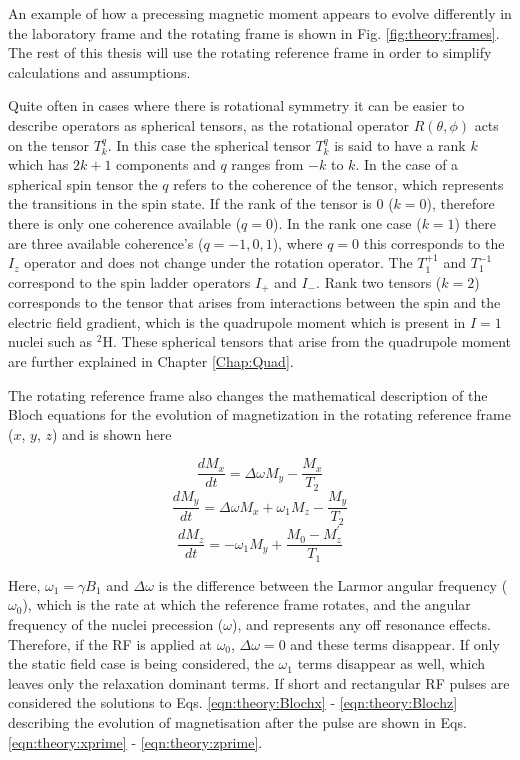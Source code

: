 An example of how a precessing magnetic moment appears to evolve differently in the laboratory frame and the rotating frame is shown in Fig. \ref{fig:theory:frames}. The rest of this thesis will use the rotating reference frame in order to simplify calculations and assumptions. 

Quite often in cases where there is rotational symmetry it can be easier to describe operators as spherical tensors, as the rotational operator $R(\theta,\phi)$ acts on the tensor $T^q_k$. In this case the spherical tensor $T_k^{q}$ is said to have a rank $k$ which has $2k+1$ components and $q$ ranges from $-k$ to $k$. In the case of a spherical spin tensor the $q$ refers to the coherence of the tensor, which represents the transitions in the spin state. If the rank of the tensor is 0 ($k = 0$), therefore there is only one coherence available ($q = 0$). In the rank one case ($k=1$) there are three available coherence's ($q=-1,0,1$), where $q=0$ this corresponds to the $I_z$ operator and does not change under the rotation operator. The $T_1^{+1}$ and $T_1^{-1}$ correspond to the spin ladder operators $I_+$ and $I_-$. Rank two tensors ($k=2$) corresponds to the tensor that arises from interactions between the spin and the electric field gradient, which is the quadrupole moment which is present in $I=1$ nuclei such as $^2$H. These spherical tensors that arise from the quadrupole moment are further explained in Chapter \ref{Chap:Quad}.

The rotating reference frame also changes the mathematical description of the Bloch equations for the evolution of magnetization in the rotating reference frame ($x$, $y$, $z$) and is shown here 

\begin{equation}
    \frac{dM_x}{dt} = \Delta\omega M_y - \frac{M_x}{T_2}
    \label{eqn:theory:Blochx}
\end{equation}
\begin{equation}
    \frac{dM_y}{dt} = \Delta\omega M_x + \omega_1M_z - \frac{M_y}{T_2}
    \label{eqn:theory:Blochy}
\end{equation}
\begin{equation}
    \frac{dM_z}{dt} = -\omega_1M_y + \frac{M_0-M_z^{'}}{T_1}
    \label{eqn:theory:Blochz}
\end{equation}

Here, $\omega_1=\gamma B_1$ and $\Delta\omega$ is the difference between the Larmor angular frequency ($\omega_0$), which is the rate at which the reference frame rotates, and the angular frequency of the nuclei precession ($\omega$), and represents any off resonance effects. Therefore, if the \ac{RF} is applied at $\omega_0$, $\Delta\omega=0$ and these terms disappear. If only the static field case is being considered, the $\omega_1$ terms disappear as well, which leaves only the relaxation dominant terms. If short and rectangular \ac{RF} pulses are considered the solutions to Eqs. \ref{eqn:theory:Blochx} - \ref{eqn:theory:Blochz} describing the evolution of magnetisation after the pulse are shown in Eqs. \ref{eqn:theory:xprime} - \ref{eqn:theory:zprime}.

